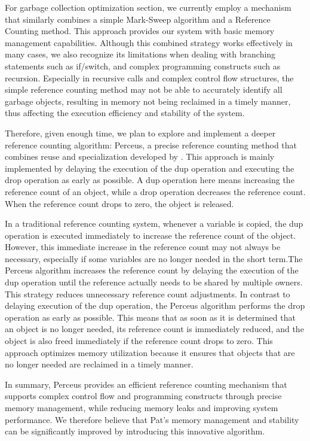 \documentclass{l4proj}
\begin{document}
For garbage collection optimization section, we currently employ a mechanism that similarly combines a simple Mark-Sweep algorithm and a Reference Counting method. This approach provides our system with basic memory management capabilities. Although this combined strategy works effectively in many cases, we also recognize its limitations when dealing with branching statements such as if/switch, and complex programming constructs such as recursion. Especially in recursive calls and complex control flow structures, the simple reference counting method may not be able to accurately identify all garbage objects, resulting in memory not being reclaimed in a timely manner, thus affecting the execution efficiency and stability of the system.

Therefore, given enough time, we plan to explore and implement a deeper reference counting algorithm: Perceus, a precise reference counting method that combines reuse and specialization developed by \cite{reinking_2021_perceus}. This approach is mainly implemented by delaying the execution of the dup operation and executing the drop operation as early as possible. A dup operation here means increasing the reference count of an object, while a drop operation decreases the reference count. When the reference count drops to zero, the object is released.

In a traditional reference counting system, whenever a variable is copied, the dup operation is executed immediately to increase the reference count of the object. However, this immediate increase in the reference count may not always be necessary, especially if some variables are no longer needed in the short term.The Perceus algorithm increases the reference count by delaying the execution of the dup operation until the reference actually needs to be shared by multiple owners. This strategy reduces unnecessary reference count adjustments. In contrast to delaying execution of the dup operation, the Perceus algorithm performs the drop operation as early as possible. This means that as soon as it is determined that an object is no longer needed, its reference count is immediately reduced, and the object is also freed immediately if the reference count drops to zero. This approach optimizes memory utilization because it ensures that objects that are no longer needed are reclaimed in a timely manner.

In summary, Perceus provides an efficient reference counting mechanism that supports complex control flow and programming constructs through precise memory management, while reducing memory leaks and improving system performance. We therefore believe that Pat's memory management and stability can be significantly improved by introducing this innovative algorithm.
\end{document}
